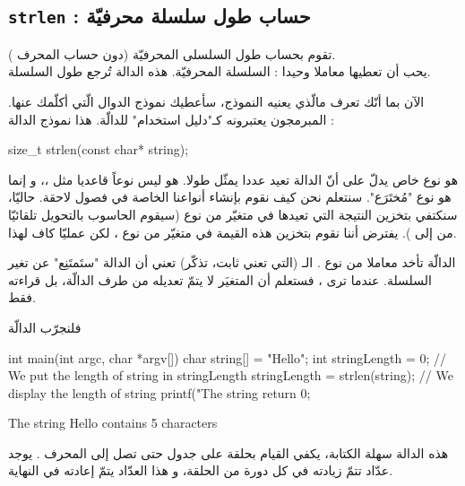 \subsection{\texttt{strlen} : حساب طول سلسلة محرفيّة}

تقوم بحساب طول السلسلى المحرفيّة (دون حساب المحرف
).\\
يحب أن تعطيها معاملا وحيدا : السلسلة المحرفيّة. هذه الدالة تُرجع طول السلسلة.

الآن بما أنّك تعرف مالّذي يعنيه النموذج، سأعطيك نموذج الدوال الّتي أكلّمك عنها. المبرمجون يعتبرونه كـ"دليل استخدام" للدالّة.
هذا نموذج الدالة :

\begin{Csource}
size_t strlen(const char* string);
\end{Csource}

\begin{information}
هو نوع خاص يدلّ على أنّ الدالة تعيد عددا يمثّل طولا. هو ليس نوعاً قاعديا مثل
،،
و إنما هو نوع  "مُختَرَع". سنتعلم نحن كيف نقوم بإنشاء أنواعنا الخاصة في فصول لاحقة. حاليّا، سنكتفي بتخزين النتيجة التي تعيدها
في متغيّر من نوع
(سيقوم الحاسوب بالتحويل تلقائيّا من
إلى
).
يفترض أننا نقوم بتخزين هذه القيمة في متغيّر من نوع
،
لكن عمليّا
كاف لهذا.
\end{information}

الدالّة تأخد معاملا من نوع
.
الـ (التي تعني ثابت، تذكّر) تعني أن الدالة "ستَمتَنِع" عن تغير السلسلة. عندما ترى
،
فستعلم أن المتغيَر لا يتمّ تعديله من طرف الدالّة، بل قراءته فقط.

فلنجرّب الدالّة 

\begin{Csource}
int main(int argc, char *argv[])
{
	char string[] = "Hello";
	int stringLength = 0;
	// We put the length of string in stringLength
	 stringLength = strlen(string);
	// We display the length of string
	printf("The string %
	return 0;
}
\end{Csource}

\begin{Console}
The string Hello contains 5 characters
\end{Console}

هذه الدالة سهلة الكتابة، يكفي القيام بحلقة على جدول
حتى تصل إلى المحرف
.
يوجد عدّاد تتمّ زيادته في كل دورة من الحلقة، و هذا العدّاد يتمّ إعادته في النهاية.

